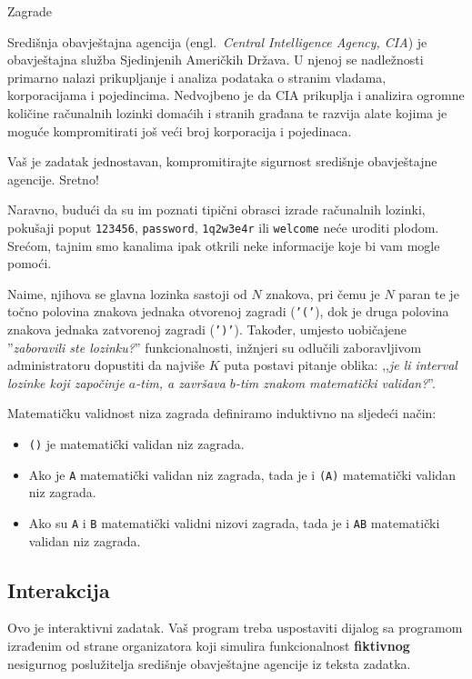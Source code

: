 \begin{statement}[
  problempoints=100,
  timelimit=1 sekunda,
  memorylimit=512 MiB,
]{Zagrade}

Središnja obavještajna agencija (engl.\ \textit{Central Intelligence Agency,
CIA}) je obavještajna služba Sjedinjenih Američkih Država. U njenoj se
nadležnosti primarno nalazi prikupljanje i analiza podataka o stranim
vladama, korporacijama i pojedincima. Nedvojbeno je da CIA prikuplja i analizira
ogromne količine računalnih lozinki domaćih i stranih građana te razvija alate
kojima je moguće kompromitirati još veći broj korporacija i pojedinaca.

Vaš je zadatak jednostavan, kompromitirajte sigurnost središnje obavještajne
agencije. Sretno!

Naravno, budući da su im poznati tipični obrasci izrade računalnih lozinki,
pokušaji poput \texttt{123456}, \texttt{password}, \texttt{1q2w3e4r} ili
\texttt{welcome} neće uroditi plodom. Srećom, tajnim smo kanalima ipak otkrili
neke informacije koje bi vam mogle pomoći.

Naime, njihova se glavna lozinka sastoji od $N$ znakova, pri čemu je $N$ paran
te je točno polovina znakova jednaka otvorenoj zagradi (\texttt{'('}), dok je
druga polovina znakova jednaka zatvorenoj zagradi (\texttt{')'}). Također,
  umjesto uobičajene ''\textit{zaboravili ste lozinku?}'' funkcionalnosti,
inžnjeri su odlučili zaboravljivom administratoru dopustiti da
najviše $K$ puta postavi pitanje oblika: ,,\textit{je li interval lozinke koji
započinje $a$-tim, a završava $b$-tim znakom matematički validan?}''.

Matematičku validnost niza zagrada definiramo induktivno na sljedeći način:

\begin{itemize}
  \item \texttt{()} je matematički validan niz zagrada.
  \item Ako je \texttt{A} matematički validan niz zagrada, tada je i
        \texttt{(A)} matematički validan niz zagrada.
  \item Ako su \texttt{A} i \texttt{B} matematički validni nizovi zagrada,
        tada je i \texttt{AB} matematički validan niz zagrada.
\end{itemize}

\subsection*{Interakcija}
Ovo je interaktivni zadatak. Vaš program treba uspostaviti dijalog sa programom
izrađenim od strane organizatora koji simulira funkcionalnost
\textbf{fiktivnog} nesigurnog poslužitelja središnje obavještajne agencije iz
teksta zadatka.


\end{statement}
